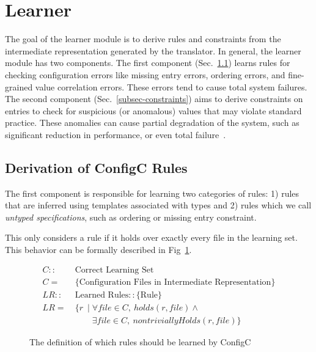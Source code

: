 \section{Learner}
\label{sec-learn}


The goal of the learner module is to derive rules and constraints from
the intermediate representation generated by the translator.
In general, the learner module has two components.
The first component (Sec.~\ref{subsec-rules}) 
learns rules for checking configuration errors like
missing entry errors, ordering errors, 
and fine-grained value correlation errors. 
These errors tend to cause total system failures.
The second component (Sec.~\ref{subsec-constraints}) aims to derive 
constraints on entries to check for suspicious (or anomalous) values 
that may violate standard practice. These anomalies can cause partial 
degradation of the system, 
such as significant reduction in performance, or even 
total failure~\cite{zhang14encore}.

\subsection{Derivation of ConfigC Rules}
\label{subsec-rules}

The first component is responsible for learning two categories of rules: 
1) rules that are inferred using templates associated with types 
and 2) rules which we call \emph{untyped specifications},
such as ordering or missing entry constraint.

This only considers a rule if it holds over exactly every file in 
the learning set. This behavior can be formally described in Fig~\ref{fig:configC}.

\begin{figure}[!h]
\begin{small}
\belowdisplayskip=-15pt
\abovedisplayskip=-2pt
\begin{align*}
C ::&\ \text{Correct Learning Set}\\
C =&\ \text{\{Configuration Files in Intermediate Representation\}}\\
LR ::&\ \text{Learned Rules} :: \{\textrm{Rule}\}\\
LR =&\ \{ r\ \mid \forall file \in C,\ holds(r,file) \land \\
&\qquad \ \exists file \in C,\ nontriviallyHolds(r,file)\} 
\end{align*}
\end{small}
\caption{The definition of which rules should be learned by ConfigC}
\label{fig:configC}
\end{figure}

